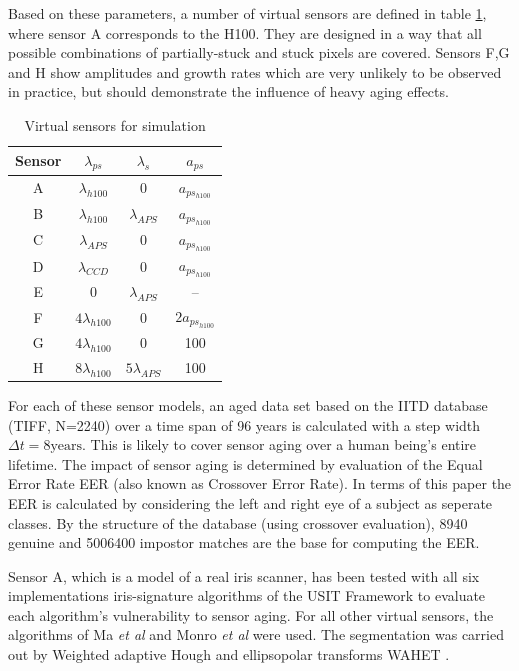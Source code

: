 \documentclass[10pt,twocolumn,letterpaper]{article}
\begin{document}
\egroup

  Based on these parameters, a number of virtual sensors are defined in table \ref{table:tests}, where sensor A corresponds to the H100. They are designed in a way that all possible combinations of partially-stuck and stuck pixels are covered. Sensors F,G and H show amplitudes and growth rates which are very unlikely to be observed in practice, but should demonstrate the influence of heavy aging effects. 
 
 \begin{table}[h]  
  \begin{tabular}{c | c c c }
  Sensor & $\lambda_{ps}$ & $\lambda_{s}$ & $a_{ps}$  \\
  \hline
  A	&	$\lambda_{h100}$ & 0 & $a_{ps_{h100}}$ \\
  B & $\lambda_{h100}$ & $\lambda_{APS}$ & $a_{ps_{h100}}$ \\
  C & $\lambda_{APS}$ & 0 & $a_{ps_{h100}}$    \\
  D & $\lambda_{CCD}$ & 0 & $a_{ps_{h100}}$   \\
  E & 0 & $\lambda_{APS}$ & -- \\
  F & $ 4 \lambda_{h100}$ & 0 & $ 2 a_{ps_{h100}}$ \\
  G & $ 4 \lambda_{h100}$ & 0 & 100 \\
  H & $ 8 \lambda_{h100}$ &  $ 5 \lambda_{APS}$ & 100

  \end{tabular}
    \label{table:tests}
    \vspace{3mm}
    \caption{Virtual sensors for simulation}
 \end{table}
  
  For each of these sensor models, an aged data set based on the IITD database \cite{iitd} (TIFF, N=2240) over a time span of 96 years is calculated with a step width $\Delta t=8 \text{years}$. This is likely to cover sensor aging over a human being's entire lifetime. The impact of sensor aging is determined by evaluation of the Equal Error Rate EER (also known as Crossover Error Rate). In terms of this paper the EER is calculated by considering the left and right eye of a subject as seperate classes. By the structure of the database (using crossover evaluation), 8940 genuine and 5006400 impostor matches are the base for computing the EER.
  
  Sensor A, which is a model of a real iris scanner, has been tested with all six implementations iris-signature algorithms of the USIT Framework to evaluate each algorithm's vulnerability to sensor aging. For all other virtual sensors, the algorithms of Ma \emph{et al} \cite{Ma} and Monro \emph{et al} \cite{Monro} were used. The segmentation was carried out by Weighted adaptive Hough and ellipsopolar transforms WAHET \cite{wahet}. 
 
\end{document}
